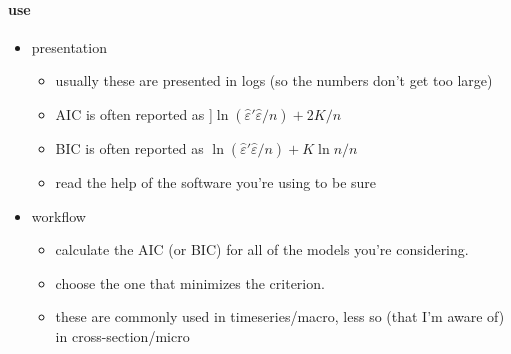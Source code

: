 \paragraph{use}
\begin{itemize}
\item presentation
\begin{itemize}
\item usually these are presented in logs (so the numbers don't get
           too large)
\item AIC is often reported as ]$\ln(\hat{\varepsilon}'\hat{\varepsilon}/n) + 2K/n$
\item BIC is often reported as
           $\ln(\hat{\varepsilon}'\hat{\varepsilon}/n) + K\ln n/n$
\item read the help of the software you're using to be sure
\end{itemize}
\item workflow
\begin{itemize}
\item calculate the AIC (or BIC) for all of the models you're considering.
\item choose the one that minimizes the criterion.
\item these are commonly used in timeseries/macro, less so (that
           I'm aware of) in cross-section/micro
\end{itemize}
\end{itemize}

